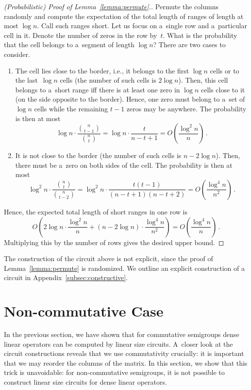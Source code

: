 \documentclass[11pt,letterpaper]{article}
\begin{document}
\begin{proof}[(Probabilistic) Proof of Lemma~\ref{lemma:permute}.]
Permute the columns randomly and compute the expectation of
the total length of ranges of length at most $\log n$. Call such ranges short. Let us focus on a~single row and a~particular cell in it. Denote the number of zeros in the row by~$t$. What is the probability that the cell belongs to a~segment of length $\log n$? There are two cases to consider.
\begin{enumerate}
\item The cell lies close to the border, i.e., it belongs to
the first $\log n$ cells or to the last~$\log n$ cells
(the number of such cells is $2\log n$). Then,
this cell belongs to a~short range iff there is at least one zero
in $\log n$ cells close to it (on the side opposite to the border).
Hence, one zero must belong to a~set of $\log n$ cells while the remaining $t-1$ zeros may be anywhere.
The probability is then at most
\[\log n \cdot \frac{\binom{n}{t-1}}{\binom{n}{t}}=\log n \cdot \frac{t}{n-t+1}=O\left(\frac{\log^2n}{n}\right) \, .\]
\item It is not close to the border (the number of such cells is $n-2\log n$). Then, there must be a~zero on both sides of the
cell. The probability is then at most
\[\log^2 n \cdot \frac{\binom{n}{t}}{\binom{n}{t-2}}=\log^2n \cdot \frac{t(t-1)}{(n-t+1)(n-t+2)}=O\left(\frac{\log^4 n}{n^2}\right) \, .\]
\end{enumerate}
Hence, the expected total length of short ranges in one row is
\[O\left( 2\log n \cdot \frac{\log^2 n}{n} + (n-2\log n) \cdot \frac{\log^4 n}{n^2}\right)=O\left(\frac{\log^4 n}{n}\right) \, .\]
Multiplying this by the number of rows gives the desired upper bound.
\end{proof}

The construction of the circuit above is not explicit, since the proof of Lemma~\ref{lemma:permute} is randomized. We outline an explicit construction of a circuit in Appendix~\ref{subsec:constructive}.


\section{Non-commutative Case}\label{sec-non-commutative}

In the previous section, we have shown that for commutative semigroups dense linear operators can be computed by linear size circuits. A~closer look at the circuit constructions reveals that we use commutativity crucially: it is important that we may reorder the columns of the matrix. In this section, we show that this trick is unavoidable: for non-commutative semigroups, it is not possible to construct linear size circuits for dense linear operators.
\end{document}
